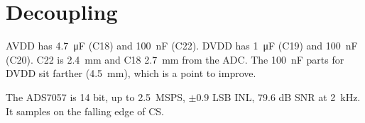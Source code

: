 \documentclass[11pt,a4paper]{article}
\begin{document}
\section{Decoupling}
AVDD has \SI{4.7}{\micro F} (C18) and \SI{100}{nF} (C22). DVDD has \SI{1}{\micro F} (C19) and \SI{100}{nF} (C20). C22 is \SI{2.4}{mm} and C18 \SI{2.7}{mm} from the ADC. The \SI{100}{nF} parts for DVDD sit farther (\SI{4.5}{mm}), which is a point to improve.

\begin{key}
The ADS7057 is 14 bit, up to \SI{2.5}{MSPS}, $\pm0.9$ LSB INL, 79.6 dB SNR at \SI{2}{kHz}. It samples on the falling edge of CS.
\end{key}
\end{document}
